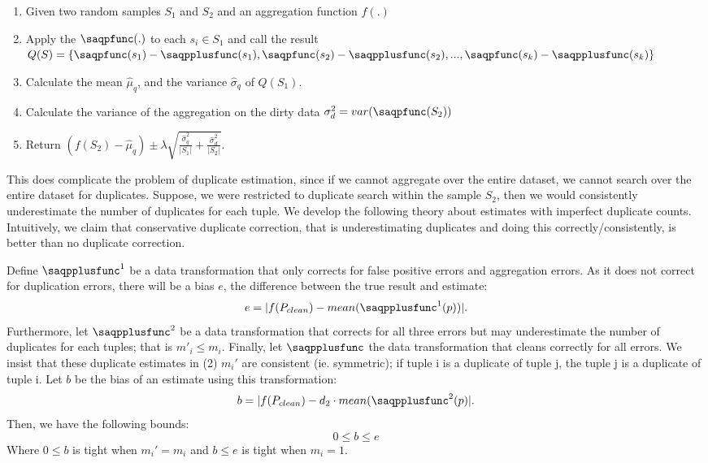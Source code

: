 \begin{enumerate}
\item Given two random samples $S_1$ and $S_2$ and an aggregation function $f(.)$
\item Apply the $\saqpfunc(.)$ to each $s_i \in S_1$ and call the result $Q(S)=\{\saqpfunc(s_1)-\saqpplusfunc(s_1),\saqpfunc(s_2)-\saqpplusfunc(s_2),...,\saqpfunc(s_k)-\saqpplusfunc(s_k)\}$
\item Calculate the mean $\hat{\mu}_q$, and the variance $\hat{\sigma}_q$ of $Q(S_1)$.
\item Calculate the variance of the aggregation on the dirty data $\sigma_d^2=var(\saqpfunc(S_2))$ 
\item Return $(f(S_2) - \hat{\mu}_q) \pm \lambda \sqrt{\frac{\hat{\sigma}_q^2}{|S_1|} + \frac{\hat{\sigma}_d^2}{|S_2|}}$.
\end{enumerate}

This does complicate the problem of duplicate estimation, since if we cannot aggregate over the entire dataset, we cannot search over the entire dataset for duplicates.
Suppose, we were restricted to duplicate search within the sample $S_2$, then we would consistently underestimate the number of duplicates for each tuple.
We develop the following theory about estimates with imperfect duplicate counts.
Intuitively, we claim that conservative duplicate correction, that is underestimating duplicates and doing this correctly/consistently, is better than no duplicate correction.

\begin{theorem}
Define $\saqpplusfunc^{1}$ be a data transformation that only corrects for false positive errors and aggregation errors.
As it does not correct for duplication errors, there will be a bias $e$, the difference between the true result and estimate:
\[ e = |f(P_{clean})- mean(\saqpplusfunc^{1}(p))|. \]
Furthermore, let $\saqpplusfunc^{2}$ be a data transformation that corrects for all three errors but may underestimate the number of duplicates for each tuples;
that is $m'_{i}\le m_{i}$.
Finally, let $\saqpplusfunc$ the data transformation that cleans correctly for all errors.
We insist that these duplicate estimates in (2) $m_{i}'$ are consistent (ie. symmetric); if tuple i is a duplicate of tuple j, the tuple j is a duplicate of tuple i.
Let $b$ be the bias of an estimate using this transformation:
\[ b = |f(P_{clean})-d_2 \cdot mean(\saqpplusfunc^{2}(p)|. \]
Then, we have the following bounds:
\begin{equation}
0 \le b \le e
\end{equation}
Where $0\le b$ is tight when $m_i'=m_i$ and $b\le e$ is tight when $m_i=1$.
\end{theorem}

